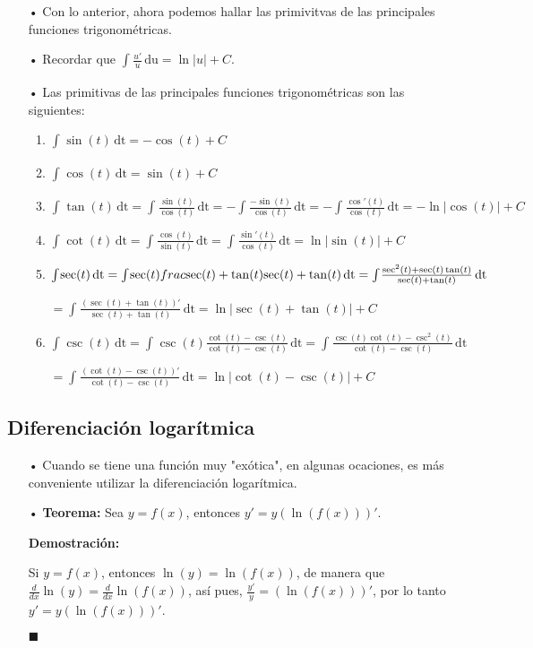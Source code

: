 \documentclass[pts12]{article}
\numberwithin{equation}{section}
\newcommand{\Col}{\color{ProcessBlue}}
\newcommand{\xinteg}[4]{\int_{#1}^{#2} \! {#3} \, \mathrm{#4}}
\begin{document}
\begin{itemize}
\item[\Col •] Con lo anterior, ahora podemos hallar las primivitvas de las principales funciones trigonométricas. 

\item[\Col •] Recordar que $\xinteg{}{}{\frac{u'}{u}}{du}=\ln|u|+C$.

\item[\Col •] Las primitivas de las principales funciones trigonométricas son las siguientes:

\begin{enumerate}
\item $\xinteg{}{}{\sin(t)}{dt}=-\cos(t)+C$
\item $\xinteg{}{}{\cos(t)}{dt}=\sin(t)+C$
\item $\xinteg{}{}{\tan(t)}{dt}=\xinteg{}{}{\frac{\sin(t)}{\cos(t)}}{dt}=-\xinteg{}{}{\frac{-\sin(t)}{\cos(t)}}{dt}=-\xinteg{}{}{\frac{\cos'(t)}{\cos(t)}}{dt}=-\ln|\cos(t)|+C$
\item $\xinteg{}{}{\cot(t)}{dt}=\xinteg{}{}{\frac{\cos(t)}{\sin(t)}}{dt}=\xinteg{}{}{\frac{\sin'(t)}{\cos(t)}}{dt}=\ln|\sin(t)|+C$
\item $\xinteg{}{}{\sec(t)}{dt}=\xinteg{}{}{\sec(t)\\frac{\sec(t)+\tan(t)}{\sec(t)+\tan(t)}}{dt}=\xinteg{}{}{\frac{\sec^2(t)+\sec(t)\tan(t)}{\sec(t)+\tan(t)}}{dt}$

$=\xinteg{}{}{\frac{(\sec(t)+\tan(t))'}{\sec(t)+\tan(t)}}{dt}=\ln|\sec(t)+\tan(t)|+C$
\item $\xinteg{}{}{\csc(t)}{dt}=\xinteg{}{}{\csc(t)\frac{\cot(t)-\csc(t)}{\cot(t)-\csc(t)}}{dt}=\xinteg{}{}{\frac{\csc(t)\cot(t)-\csc^2(t)}{\cot(t)-\csc(t)}}{dt}$

$=\xinteg{}{}{\frac{(\cot(t)-\csc(t))'}{\cot(t)-\csc(t)}}{dt}=\ln|\cot(t)-\csc(t)|+C$
\end{enumerate}

\end{itemize}

\subsection{\Col Diferenciación logarítmica}

\begin{itemize}
\item[\Col •] Cuando se tiene una función muy "exótica", en algunas ocaciones, es más conveniente utilizar la diferenciación logarítmica.

\item[\Col •] \textbf{Teorema:} Sea $y=f(x)$, entonces $y'=y(\ln(f(x)))'$.

\textbf{Demostración:}
  
Si $y=f(x)$, entonces $\ln(y)=\ln(f(x))$, de manera que $\frac{d}{dx}\ln(y)=\frac{d}{dx}\ln(f(x))$, así pues, $\frac{y'}{y}=(\ln(f(x)))'$, por lo tanto $y'=y(\ln(f(x)))'$.  
  
\begin{flushright}
$\blacksquare$
\end{flushright}  
  
\end{itemize}
\end{document}
